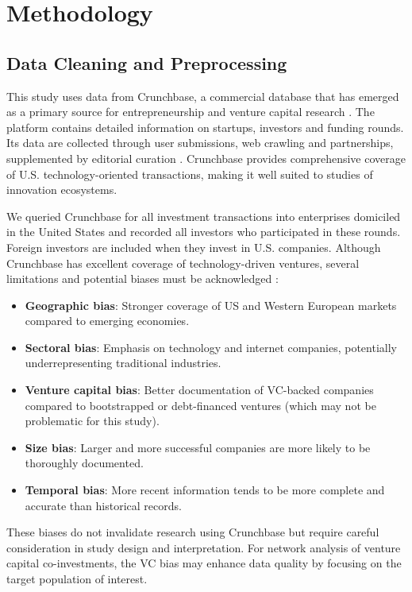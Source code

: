 \section{Methodology}

\subsection{Data Cleaning and Preprocessing}

This study uses data from Crunchbase, a commercial database that has emerged as a primary source for entrepreneurship and venture capital research \cite{OECD2017}. The platform contains detailed information on startups, investors and funding rounds. Its data are collected through user submissions, web crawling and partnerships, supplemented by editorial curation \cite{OECD2017}. Crunchbase provides comprehensive coverage of U.S. technology-oriented transactions, making it well suited to studies of innovation ecosystems.

We queried Crunchbase for all investment transactions into enterprises domiciled in the United States and recorded all investors who participated in these rounds. Foreign investors are included when they invest in U.S. companies. Although Crunchbase has excellent coverage of technology-driven ventures, several limitations and potential biases must be acknowledged \cite{OECD2017}:

\begin{itemize}
    \item \textbf{Geographic bias}: Stronger coverage of US and Western European markets compared to emerging economies.
    \item \textbf{Sectoral bias}: Emphasis on technology and internet companies, potentially underrepresenting traditional industries.
    \item \textbf{Venture capital bias}: Better documentation of VC-backed companies compared to bootstrapped or debt-financed ventures (which may not be problematic for this study).
    \item \textbf{Size bias}: Larger and more successful companies are more likely to be thoroughly documented.
    \item \textbf{Temporal bias}: More recent information tends to be more complete and accurate than historical records.
\end{itemize}

These biases do not invalidate research using Crunchbase but require careful consideration in study design and interpretation. For network analysis of venture capital co-investments, the VC bias may enhance data quality by focusing on the target population of interest.

